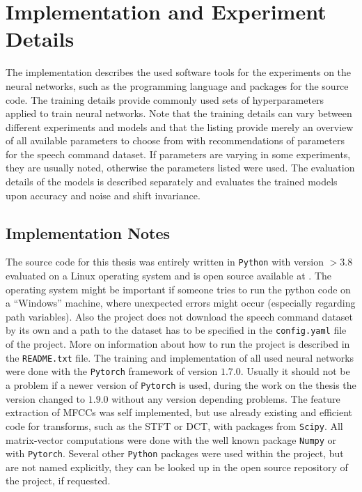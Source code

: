 
\section{Implementation and Experiment Details}\label{sec:exp_details}
\thesisStateRevised
The implementation describes the used software tools for the experiments on the neural networks, such as the programming language and packages for the source code.
The training details provide commonly used sets of hyperparameters applied to train neural networks.
Note that the training details can vary between different experiments and models and that the listing provide merely an overview of all available parameters to choose from with recommendations of parameters for the speech command dataset.
If parameters are varying in some experiments, they are usually noted, otherwise the parameters listed were used.
The evaluation details of the models is described separately and evaluates the trained models upon accuracy and noise and shift invariance.



\subsection{Implementation Notes}\label{sec:exp_details_implementation}
The source code for this thesis was entirely written in \texttt{Python} with version $>3.8$ evaluated on a Linux operating system and is open source available at \cite{KWSGame}.
The operating system might be important if someone tries to run the python code on a \enquote{Windows} machine, where unexpected errors might occur (especially regarding path variables).
Also the project does not download the speech command dataset by its own and a path to the dataset has to be specified in the \texttt{config.yaml} file of the project.
More on information about how to run the project is described in the \texttt{README.txt} file.
The training and implementation of all used neural networks were done with the \texttt{Pytorch} \cite{Pytorch} framework of version $1.7.0$. 
Usually it should not be a problem if a newer version of \texttt{Pytorch} is used, during the work on the thesis the version changed to $1.9.0$ without any version depending problems.
The feature extraction of MFCCs was self implemented, but use already existing and efficient code for transforms, such as the STFT or DCT, with packages from \texttt{Scipy}.
All matrix-vector computations were done with the well known package \texttt{Numpy} or with \texttt{Pytorch}.
Several other \texttt{Python} packages were used within the project, but are not named explicitly, they can be looked up in the open source repository of the project, if requested.


